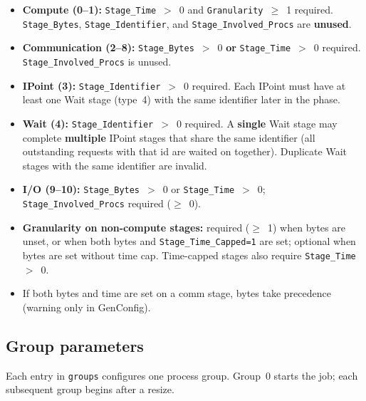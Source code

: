 \begin{itemize}
  \item \textbf{Compute (0--1):} \texttt{Stage\_Time}~$>$~0 and \texttt{Granularity}~$\geq$~1 required. \texttt{Stage\_Bytes}, \texttt{Stage\_Identifier}, and \texttt{Stage\_Involved\_Procs} are \textbf{unused}.
  \item \textbf{Communication (2--8):} \texttt{Stage\_Bytes}~$>$~0 \textbf{or} \texttt{Stage\_Time}~$>$~0 required. \texttt{Stage\_Involved\_Procs} is unused.
  \item \textbf{IPoint (3):} \texttt{Stage\_Identifier}~$>$~0 required. Each IPoint must have at least one Wait stage (type~4) with the same identifier later in the phase.
  \item \textbf{Wait (4):} \texttt{Stage\_Identifier}~$>$~0 required. A \textbf{single} Wait stage may complete \textbf{multiple} IPoint stages that share the same identifier (all outstanding requests with that id are waited on together). Duplicate Wait stages with the same identifier are invalid.
  \item \textbf{I/O (9--10):} \texttt{Stage\_Bytes}~$>$~0 or \texttt{Stage\_Time}~$>$~0; \texttt{Stage\_Involved\_Procs} required ($\geq$~0).
  \item \textbf{Granularity on non-compute stages:} required ($\geq$~1) when bytes are unset, or when both bytes and \texttt{Stage\_Time\_Capped=1} are set; optional when bytes are set without time cap. Time-capped stages also require \texttt{Stage\_Time}~$>$~0.
  \item If both bytes and time are set on a comm stage, bytes take precedence (warning only in GenConfig).
\end{itemize}

\subsection{Group parameters}
\label{subsection:group-params}

Each entry in \texttt{groups} configures one process group. Group~0 starts the job; each subsequent group begins after a resize.

